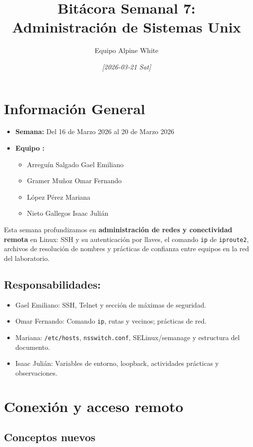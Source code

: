 \documentclass[11pt, letterpaper]{article}
\author{Equipo Alpine White}
\date{\textit{{[}2026-03-21 Sat]}}
\title{Bitácora Semanal 7: Administración de Sistemas Unix}
\begin{document}
\maketitle
\setcounter{tocdepth}{2}
\tableofcontents

\section{Información General}
\label{sec:orgd3fad95}
\begin{itemize}
\item \textbf{Semana:} Del 16 de Marzo 2026 al 20 de Marzo 2026
\item \textbf{Equipo :}
\begin{itemize}
\item Arreguín Salgado Gael Emiliano
\item Gramer Muñoz Omar Fernando
\item López Pérez Mariana
\item Nieto Gallegos Isaac Julián
\end{itemize}
\end{itemize}

Esta semana profundizamos en \textbf{administración de redes y conectividad remota} en Linux: SSH y su autenticación por llaves, el comando \texttt{ip} de \texttt{iproute2}, archivos de resolución de nombres y prácticas de confianza entre equipos en la red del laboratorio.
\subsection{Responsabilidades:}
\label{sec:org126e8c8}
\begin{itemize}
\item Gael Emiliano: SSH, Telnet y sección de máximas de seguridad.
\item Omar Fernando: Comando \texttt{ip}, rutas y vecinos; prácticas de red.
\item Mariana: \texttt{/etc/hosts}, \texttt{nsswitch.conf}, SELinux/semanage y estructura del documento.
\item Isaac Julián: Variables de entorno, loopback, actividades prácticas y observaciones.
\end{itemize}
\section{Conexión y acceso remoto}
\label{sec:org5a0f292}

\subsection{Conceptos nuevos}
\label{sec:orgfa0563d}
\end{document}
